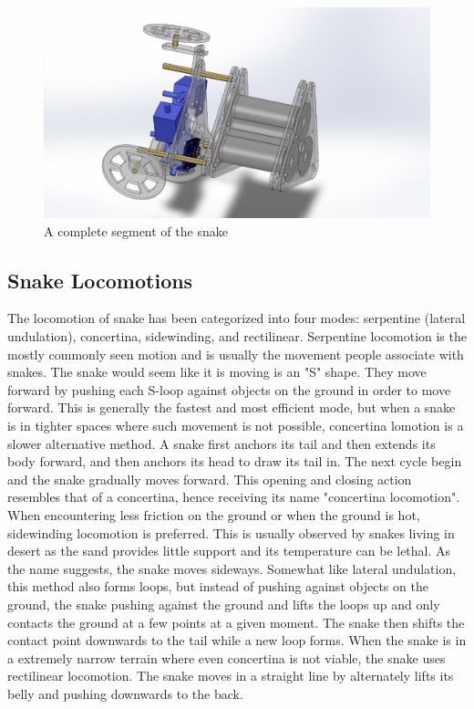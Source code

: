 \documentclass[twoside]{article}
\begin{document}
\begin{figure}[H]
	\includegraphics{overall_structure}
	\centering
	\caption{A complete segment of the snake}
\end{figure}

\subsection{Snake Locomotions}
The locomotion of snake has been categorized into four modes: serpentine (lateral undulation), concertina, sidewinding, and rectilinear. Serpentine locomotion is the mostly commonly seen motion and is usually the movement people associate with snakes. The snake would seem like it is moving is an "S" shape. They move forward by pushing each S-loop against objects on the ground in order to move forward. This is generally the fastest and most efficient mode, but when a snake is in tighter spaces where such movement is not possible, concertina lomotion is a slower alternative method. A snake first anchors its tail and then extends its body forward, and then anchors its head to draw its tail in. The next cycle begin and the snake gradually moves forward. This opening and closing action resembles that of a concertina, hence receiving its name "concertina locomotion". When encountering less friction on the ground or when the ground is hot, sidewinding locomotion is preferred. This is usually observed by snakes living in desert as the sand provides little support and its temperature can be lethal. As the name suggests, the snake moves sideways. Somewhat like lateral undulation, this method also forms loops, but instead of pushing against objects on the ground, the snake pushing against the ground and lifts the loops up and only contacts the ground at a few points at a given moment. The snake then shifts the contact point downwards to the tail while a new loop forms. When the snake is in a extremely narrow terrain where even concertina is not viable, the snake uses rectilinear locomotion. The snake moves in a straight line by alternately lifts its belly and pushing downwards to the back. 
\end{document}
